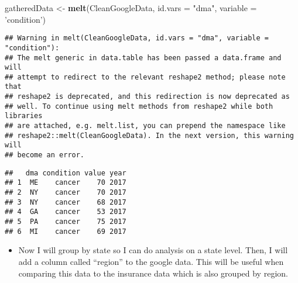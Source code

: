 \documentclass[]{article}
\newenvironment{Shaded}{\begin{snugshade}}{\end{snugshade}}
\newcommand{\DataTypeTok}[1]{\textcolor[rgb]{0.13,0.29,0.53}{#1}}
\newcommand{\DecValTok}[1]{\textcolor[rgb]{0.00,0.00,0.81}{#1}}
\newcommand{\KeywordTok}[1]{\textcolor[rgb]{0.13,0.29,0.53}{\textbf{#1}}}
\newcommand{\NormalTok}[1]{#1}
\newcommand{\OperatorTok}[1]{\textcolor[rgb]{0.81,0.36,0.00}{\textbf{#1}}}
\newcommand{\StringTok}[1]{\textcolor[rgb]{0.31,0.60,0.02}{#1}}
\providecommand{\tightlist}{%
  \setlength{\itemsep}{0pt}\setlength{\parskip}{0pt}}
\begin{document}
\begin{Shaded}
\begin{Highlighting}[]
\NormalTok{gatheredData <-}\StringTok{ }\KeywordTok{melt}\NormalTok{(CleanGoogleData, }\DataTypeTok{id.vars =} \StringTok{"dma"}\NormalTok{, }\DataTypeTok{variable =} \StringTok{'condition'}\NormalTok{)}
\end{Highlighting}
\end{Shaded}

\begin{verbatim}
## Warning in melt(CleanGoogleData, id.vars = "dma", variable = "condition"):
## The melt generic in data.table has been passed a data.frame and will
## attempt to redirect to the relevant reshape2 method; please note that
## reshape2 is deprecated, and this redirection is now deprecated as
## well. To continue using melt methods from reshape2 while both libraries
## are attached, e.g. melt.list, you can prepend the namespace like
## reshape2::melt(CleanGoogleData). In the next version, this warning will
## become an error.
\end{verbatim}

\begin{Shaded}
\end{Shaded}

\begin{verbatim}
##   dma condition value year
## 1  ME    cancer    70 2017
## 2  NY    cancer    70 2017
## 3  NY    cancer    68 2017
## 4  GA    cancer    53 2017
## 5  PA    cancer    75 2017
## 6  MI    cancer    69 2017
\end{verbatim}

\begin{itemize}
\tightlist
\item
  Now I will group by state so I can do analysis on a state level. Then,
  I will add a column called ``region'' to the google data. This will be
  useful when comparing this data to the insurance data which is also
  grouped by region.
\end{itemize}
\end{document}
